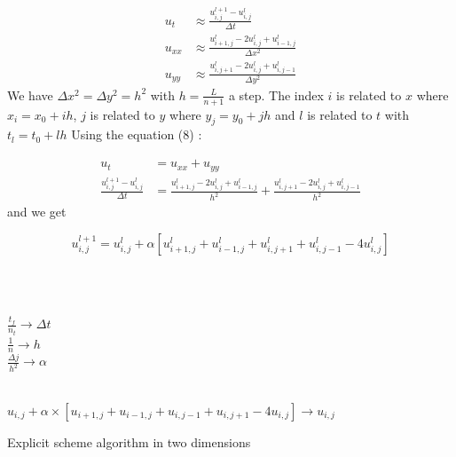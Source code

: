 \documentclass[a4paper, twoside, 11pt]{report}
\theoremstyle{theorem}
\theoremstyle{remark}
\theoremstyle{exemple}
\begin{document}
                \begin{align*}
                      u_t &\approx \frac{u_{i,j}^{l+1}-u_{i,j}^l}{\Delta t}\\
                      u_{xx} &\approx \frac{u_{i+1,j}^l-2u_{i,j}^l+u_{i-1,j}^l}{\Delta x^2}\\
                      u_{yy} &\approx \frac{u_{i,j+1}^l-2u_{i,j}^l+u_{i,j-1}^l}{\Delta y^2}
                \end{align*}
                We have $\Delta x^2 = \Delta y^2 = h^2$ with $h=\frac{L}{n+1}$ a step. The index $i$ is related to $x$ where $x_i=x_0+ih$, $j$ is related to $y$ where $y_j=y_0+jh$ and $l$ is related to $t$ with $t_l=t_0+lh$ Using the equation (8) :

                    \begin{align*}
                        u_t&=u_{xx}+u_{yy}\\
                        \frac{u_{i,j}^{l+1}-u_{i,j}^l}{\Delta t} &= \frac{u_{i+1,j}^l-2u_{i,j}^l+u_{i-1,j}^l}{h^2} + \frac{u_{i,j+1}^l-2u_{i,j}^l+u_{i,j-1}^l}{h^2}
                    \end{align*}
                and we get

                    \begin{equation*}
                        u_{i,j}^{l+1} = u_{i,j}^l +\alpha [u_{i+1,j}^l+u_{i-1,j}^l+ u_{i,j+1}^l+u_{i,j-1}^l-4u_{i,j}^l]
                        \tag{8}
                    \end{equation*}

                    \begin{center}
                    \begin{algorithm}[H]

                    \SetAlgoLined
                         \\
                         \\
                         

                        $\displaystyle \frac{t_f}{n_t}\rightarrow \Delta t$\\
                        $\displaystyle \frac{1}{n} \rightarrow h$\\
                        $\displaystyle \frac{\Delta j}{h^2}\rightarrow \alpha$

                        \ \\
                        {
                            {
                                {
                                    $u_{i,j}+\alpha \times [u_{i+1,j}+u_{i-1,j}+u_{i,j-1}+u_{i,j+1} - 4u_{i,j}]\rightarrow u_{i,j}$
                                }
                            }
                        }
                    \caption{Explicit scheme algorithm in two dimensions}
                    \end{algorithm}
                    \end{center}
\end{document}

